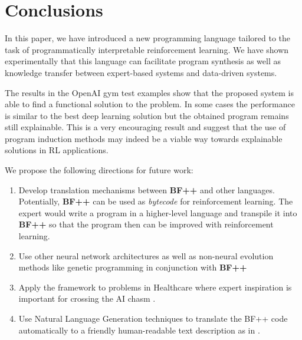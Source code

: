 \section{Conclusions}

In this paper, we have introduced a new programming language tailored to the task of programmatically interpretable reinforcement learning.
We have shown experimentally that this language can facilitate program synthesis as well as knowledge transfer between expert-based systems and data-driven systems. 

The results in the OpenAI gym test examples show that the proposed system is able to find a functional solution to the problem. In some cases the performance is similar to the best deep learning solution but the obtained program remains still explainable. This is a very encouraging result and suggest that the use of program induction methods may indeed be a viable way towards explainable solutions in RL applications. 

We propose the following directions for future work:
\begin{enumerate}
    \item Develop translation mechanisms between \textbf{BF++} and other languages. Potentially, \textbf{BF++} can be used as \emph{bytecode} \cite{bytecode} for reinforcement learning. The expert would write a program in a higher-level language and transpile it into \textbf{BF++} so that the program then can be improved with reinforcement learning.
    \item Use other neural network architectures as well as non-neural evolution methods like genetic programming \cite{genprog} in conjunction with \textbf{BF++}
    \item Apply the framework to problems in Healthcare where expert inspiration is important for crossing the AI chasm \cite{aichasm}.
    \item Use Natural Language Generation techniques to translate the BF++ code automatically to a friendly human-readable text description as in \cite{code2nlg1,code2nlg2}.
\end{enumerate}